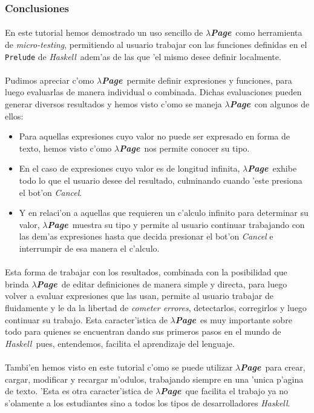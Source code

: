 \documentclass[a4paper]{article}
\newcommand{\haskell}{\textsl{Haskell}}
\newcommand{\hpage}{\textbf{\textsl{$\lambda$Page}}}
\begin{document}
\newpage
\subsubsection{Conclusiones}
\paragraph{}En este tutorial hemos demostrado un uso sencillo de \hpage\ como herramienta de \textsl{micro-testing}, permitiendo al usuario trabajar con las funciones definidas en el \texttt{Prelude} de \haskell\ adem'as de las que 'el mismo desee definir localmente.
\paragraph{}Pudimos apreciar c'omo \hpage\ permite definir expresiones y funciones, para luego evaluarlas de manera individual o combinada.  Dichas evaluaciones pueden generar diversos resultados y hemos visto c'omo se maneja \hpage\ con algunos de ellos:
\begin{itemize}
\item Para aquellas expresiones cuyo valor no puede ser expresado en forma de texto, hemos visto c'omo \hpage\ nos permite conocer su tipo.
\item En el caso de expresiones cuyo valor es de longitud infinita, \hpage\ exhibe todo lo que el usuario desee del resultado, culminando cuando 'este presiona el bot'on \textsl{Cancel}.
\item Y en relaci'on a aquellas que requieren un c'alculo infinito para determinar su valor, \hpage\ muestra su tipo y permite al usuario continuar trabajando con las dem'as expresiones hasta que decida presionar el bot'on \textsl{Cancel} e interrumpir de esa manera el c'alculo.
\end{itemize}
\paragraph{}Esta forma de trabajar con los resultados, combinada con la posibilidad que brinda \hpage\ de editar definiciones de manera simple y directa, para luego volver a evaluar expresiones que las usan, permite al usuario trabajar de fluidamente y le da la libertad de \textsl{cometer errores}, detectarlos, corregirlos y luego continuar su trabajo.  Esta caracter'istica de \hpage\ es muy importante sobre todo para quienes se encuentran dando sus primeros pasos en el mundo de \haskell\ pues, entendemos, facilita el aprendizaje del lenguaje.
\paragraph{}Tambi'en hemos visto en este tutorial c'omo se puede utilizar \hpage\ para crear, cargar, modificar y recargar m'odulos, trabajando siempre en una 'unica p'agina de texto.  'Esta es otra caracter'istica de \hpage\ que facilita el trabajo ya no s'olamente a los estudiantes sino a todos los tipos de desarrolladores \haskell.
\end{document}
